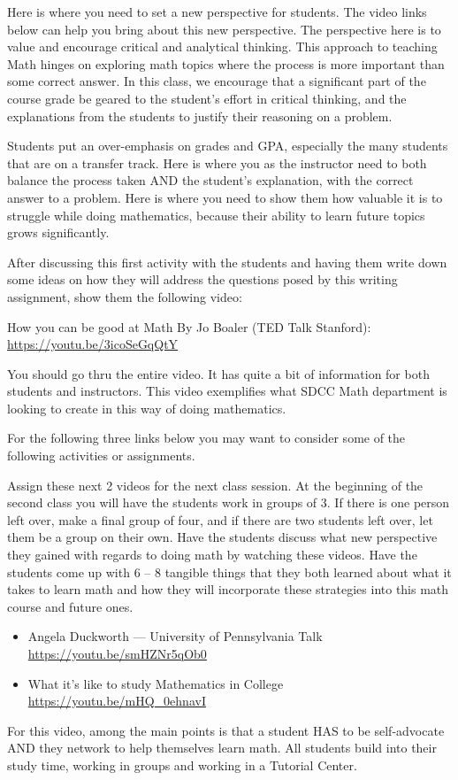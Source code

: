 \documentclass{article}
\begin{document}
\begin{notes}
  Here is where you need to set a new perspective for students.  The video links below can help you bring about this new perspective.  The perspective here is to value and encourage critical and analytical thinking.  This approach to teaching Math hinges on exploring math topics where the process is more important than some correct answer.  In this class, we encourage that a significant part of the course grade be geared to the student’s effort in critical thinking, and the explanations from the students to justify their reasoning on a problem.  

Students put an over-emphasis on grades and GPA, especially the many students that are on a transfer track.   Here is where you as the instructor need to both balance the process taken AND the student’s explanation, with the correct answer to a problem.  Here is where you need to show them how valuable it is to struggle while doing mathematics, because their ability to learn future topics grows significantly.  

After discussing this first activity with the students and having them write down some ideas on how they will address the questions posed by this writing assignment, show them the following video:

How you can be good at Math By Jo Boaler (TED Talk Stanford): \url{https://youtu.be/3icoSeGqQtY}

You should go thru the entire video. It has quite a bit of information for both students and instructors.  This video exemplifies what SDCC Math department is looking to create in this way of doing mathematics.
\end{notes}

\begin{notes}
  For the following three links below you may want to consider some of the following activities or assignments.  

Assign these next 2 videos for the next class session.  At the beginning of the second class you will have the students work in groups of 3. If there is one person left over, make a final group of four, and if there are two students left over, let them be a group on their own.  Have the students discuss what new perspective they gained with regards to doing math by watching these videos.  Have the students come up with 6 – 8 tangible things that they both learned about what it takes to learn math and how they will incorporate these strategies into this math course and future ones.
\begin{itemize}
\item Angela Duckworth --- University of Pennsylvania Talk
  \url{https://youtu.be/smHZNr5qOb0}
  
\item What it’s like to study Mathematics in College
  \url{https://youtu.be/mHQ_0ehnavI}
\end{itemize}
For this video, among the main points is that a student HAS to be self-advocate AND they network to help themselves learn math.  All students build into their study time, working in groups and working in a Tutorial Center.
\end{notes}
\end{document}
